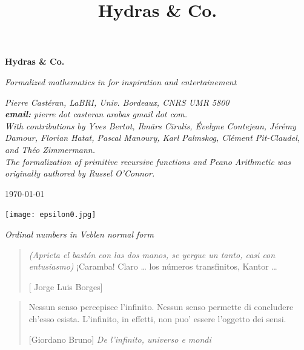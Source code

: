 \documentclass[twoside,a4paper]{book}
\title{Hydras \& Co.}
\begin{document}
\begin{titlepage}
   \begin{center}
       \vspace*{1cm}

       \textbf{\Huge Hydras \& Co.}

       \vspace{0.5cm}
        {\emph{\Large Formalized mathematics in \coq for inspiration and entertainement}}
            
       \vspace{1.5cm}

       \emph{Pierre Castéran, LaBRI, Univ. Bordeaux, CNRS UMR 5800\\ \textbf{email:} pierre dot casteran arobas gmail dot com. \\ With contributions by Yves Bertot, Ilm\={a}rs C\={i}rulis, \'Evelyne Contejean,  Jérémy Damour, Florian Hatat, Pascal Manoury, Karl Palmskog, Clément Pit-Claudel, and Théo Zimmermann. \\ The formalization of primitive recursive functions and Peano Arithmetic was originally authored by Russel O'Connor.}%

 \vfill
        \today 
   
    
            
      \end{center}
\vfill
      \centering
      \texttt{[image: epsilon0.jpg]}
      \centerline{\emph{\small {\color{darkblue}Ordinal numbers in Veblen normal form}}}
\end{titlepage}


\clearpage
\newpage
\thispagestyle{empty}
\begin{quote}
 \emph{(Aprieta el bast\'on con las dos manos, se yergue un tanto,
casi con entusiasmo)} ¡Caramba! Claro \dots{} los n\'umeros
transfinitos, Kantor \dots{}

[ Jorge Luis Borges]
\end{quote}
\vspace{17mm}
\begin{quote}
  Nessun senso percepisce l'infinito. Nessun senso permette di concludere ch'esso esista. L'infinito, in effetti, non puo' essere l'oggetto dei sensi.

  [Giordano Bruno] \emph{De l'infinito, universo e mondi}
\end{quote}
\end{document}
